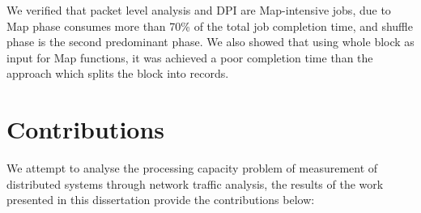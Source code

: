 We verified that packet level analysis and DPI are Map-intensive jobs, due to Map phase consumes more than 70\% of the total job completion time, and shuffle phase is the second predominant phase. We also showed that using whole block as input for Map functions, it was achieved a poor completion time than the approach which splits the block into records.

\section{Contributions}
\label{sc:conc_contributions}

We attempt to analyse the processing capacity problem of measurement of distributed systems through network traffic analysis, the results of the work presented in this dissertation provide the contributions below:

